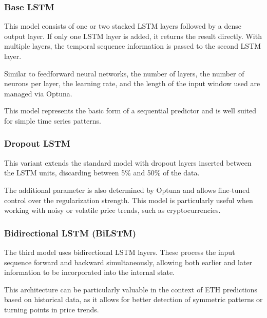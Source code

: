 \subsubsection{Base LSTM}

This model consists of one or two stacked LSTM layers followed by a dense output layer.
If only one LSTM layer is added, it returns the result directly.
With multiple layers, the temporal sequence information is passed to the second LSTM layer.

Similar to feedforward neural networks, the number of layers, the number of neurons per layer, the learning rate, and the length of the input window used are managed via Optuna.

This model represents the basic form of a sequential predictor and is well suited for simple time series patterns.



\subsubsection{Dropout LSTM}

This variant extends the standard model with dropout layers inserted between the LSTM units, discarding between 5\% and 50\% of the data.

The additional parameter is also determined by Optuna and allows fine-tuned control over the regularization strength.
This model is particularly useful when working with noisy or volatile price trends, such as cryptocurrencies.



\subsubsection{Bidirectional LSTM (BiLSTM)}

The third model uses bidirectional LSTM layers.
These process the input sequence forward and backward simultaneously, allowing both earlier and later information to be incorporated into the internal state.

This architecture can be particularly valuable in the context of ETH predictions based on historical data, as it allows for better detection of symmetric patterns or turning points in price trends.

